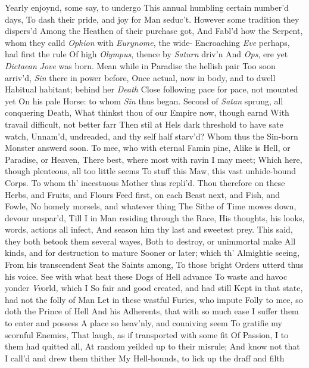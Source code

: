 \documentclass[11pt]{book}
\newcounter {first}
\newcounter {last}
\begin{document}
Yearly enjoynd, some say, to undergo 
This annual humbling certain number'd days, 
To dash their pride, and joy for Man seduc't. 
However some tradition they dispers'd 
Among the Heathen of their purchase got, 
And Fabl'd how the Serpent, whom they calld 
\textit{Ophion} with \textit{Eurynome}, the wide- 
Encroaching \textit{Eve} perhaps, had first the rule 
Of high \textit{Olympus}, thence by \textit{Saturn} driv'n 
And \textit{Ops}, ere yet \textit{Dictaean} \textit{Jove} was born. 
Mean while in Paradise the hellish pair 
Too soon arriv'd, \textit{Sin} there in power before, 
Once actual, now in body, and to dwell 
Habitual habitant; behind her \textit{Death} 
Close following pace for pace, not mounted yet 
On his pale Horse: to whom \textit{Sin} thus began. 
\quad Second of \textit{Satan} sprung, all conquering Death, 
What thinkst thou of our Empire now, though earnd 
With travail difficult, not better farr 
Then stil at Hels dark threshold to have sate watch, 
Unnam'd, undreaded, and thy self half starv'd? 
\quad Whom thus the Sin-born Monster answerd soon. 
To mee, who with eternal Famin pine, 
Alike is Hell, or Paradise, or Heaven, 
There best, where most with ravin I may meet; 
Which here, though plenteous, all too little seems 
To stuff this Maw, this vast unhide-bound Corps. 
\quad To whom th' incestuous Mother thus repli'd. 
Thou therefore on these Herbs, and Fruits, and Flours 
Feed first, on each Beast next, and Fish, and Fowle, 
No homely morsels, and whatever thing 
The Sithe of Time mowes down, devour unspar'd, 
Till I in Man residing through the Race, 
His thoughts, his looks, words, actions all infect, 
And season him thy last and sweetest prey. 
\quad This said, they both betook them several wayes, 
Both to destroy, or unimmortal make 
All kinds, and for destruction to mature 
Sooner or later; which th' Almightie seeing, 
From his transcendent Seat the Saints among, 
To those bright Orders utterd thus his voice. 
\quad See with what heat these Dogs of Hell advance 
To waste and havoc yonder \textit{Vv}orld, which I 
So fair and good created, and had still 
Kept in that state, had not the folly of Man 
Let in these wastful Furies, who impute 
Folly to mee, so doth the Prince of Hell 
And his Adherents, that with so much ease 
I suffer them to enter and possess 
A place so heav'nly, and conniving seem 
To gratifie my scornful Enemies, 
That laugh, as if transported with some fit 
Of Passion, I to them had quitted all, 
At random yeilded up to their misrule; 
And know not that I call'd and drew them thither 
My Hell-hounds, to lick up the draff and filth 
\end{document}
